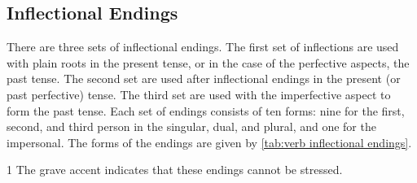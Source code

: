 \subsection{Inflectional Endings}
There are three sets of inflectional endings. The first set of inflections are
used with plain roots in the present tense, or in the case of the perfective
aspects, the past tense. The second set are used after inflectional endings in
the present (or past perfective) tense. The third set are used with the
imperfective aspect to form the past tense. Each set of endings consists of ten
forms: nine for the first, second, and third person in the singular, dual, and
plural, and one for the impersonal. The forms of the endings are given by
\cref{tab:verb inflectional endings}.

\begin{table}[h]
\centering
\caption{Verb Inflectional Endings}
\label{tab:verb inflectional endings}
\begin{threeparttable}
\begin{tablenotes}
\item[1] The grave accent indicates that these endings cannot be stressed.
\end{tablenotes}
\end{threeparttable}
\end{table}

